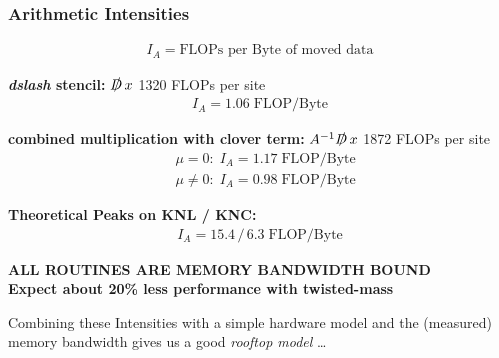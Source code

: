 \documentclass{beamer}
\begin{document}
  \begin{frame}
    \frametitle{Arithmetic Intensities}
    \vspace{-5mm}
    \footnotesize

    \begin{align*}
      I_A = \textrm{FLOPs per Byte of moved data}
    \end{align*}
    \vfill

    \textbf{\textit{dslash} stencil:} \; $\slashed D \,x$ \hfill 1320 FLOPs per site
    \begin{align*}
      I_A = 1.06 \; \textrm{FLOP/Byte}
    \end{align*}
    \vfill

    \textbf{combined multiplication with clover term:} \; $A^{-1}  \slashed D \, x$ \hfill 1872 FLOPs per site
    \begin{align*}
      &\mu = 0: \; I_A = 1.17 \; \textrm{FLOP/Byte} \\
      &\mu \neq 0: \; I_A = 0.98 \; \textrm{FLOP/Byte}
    \end{align*}
    \vfill

    \textbf{Theoretical Peaks on KNL / KNC:}
    \begin{align*}
      I_A = 15.4 \, / \, 6.3 \; \textrm{FLOP/Byte}
    \end{align*}
    \vfill

    \large
    \centering \textbf{ALL ROUTINES ARE MEMORY BANDWIDTH BOUND}\\
    \textbf{Expect about 20\% less performance with twisted-mass}

    \vfill
    {
      \footnotesize
      Combining these Intensities with a simple hardware model and the (measured) memory bandwidth
      gives us a good \textit{rooftop model} \dots
    }

  \end{frame}

\end{document}
